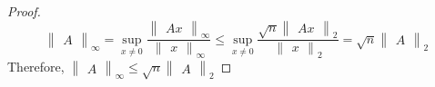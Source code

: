 \documentclass{article}
\begin{document}
\begin{proof}
    \[
        \begin{Vmatrix}
            A
        \end{Vmatrix}_{\infty}
        =
        \sup_{x \neq 0}
        \frac{
            \begin{Vmatrix}
                Ax
            \end{Vmatrix}_{\infty}
        }{
            \begin{Vmatrix}
                x
            \end{Vmatrix}_{\infty}
        } 
        \leq 
        \sup_{x \neq 0}
        \frac{
            \sqrt{n}
            \begin{Vmatrix}
                Ax
            \end{Vmatrix}_{2}
        }{
            \begin{Vmatrix}
                x
            \end{Vmatrix}_{2}
        } 
        =
        \sqrt{n}
        \begin{Vmatrix}
            A
        \end{Vmatrix}_{2}
    \]
        Therefore, $
        \begin{Vmatrix}
            A
        \end{Vmatrix}_{\infty} \leq \sqrt{n}
        \begin{Vmatrix}
            A
        \end{Vmatrix}_{2}$

\end{proof}
\end{document}
